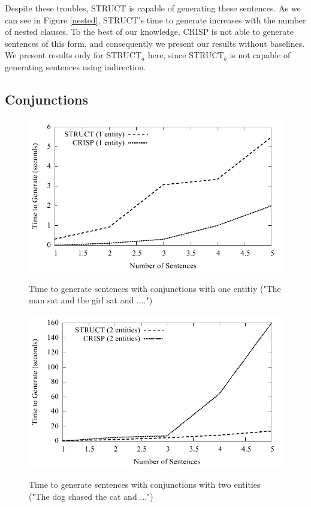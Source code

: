 Despite these troubles, STRUCT is capable of generating these sentences.  As we can
see in Figure \ref{nested}, STRUCT's time to generate increases with the number of
nested clauses.  To the best of our knowledge, CRISP is not able to generate sentences
of this form, and consequently we present our results without baselines.  We present
results only for STRUCT$_a$ here, since STRUCT$_b$ is not capable of generating
sentences using indirection.

\subsection{Conjunctions}

\begin{figure}
\centering
\includegraphics[width=0.7 \linewidth]{../analysis/struct/conjunction/conjunction1.pdf}
\label{graph-conjunction1}
\caption{Time to generate sentences with conjunctions with one entitiy ("The man sat and the girl sat and ....")}
\end{figure}

\begin{figure}
\centering
\includegraphics[width=0.7 \linewidth]{../analysis/struct/conjunction/conjunction2.pdf}
\label{graph-conjunction2}
\caption{Time to generate sentences with conjunctions with two entities ("The dog chased the cat and ...")}
\end{figure}

